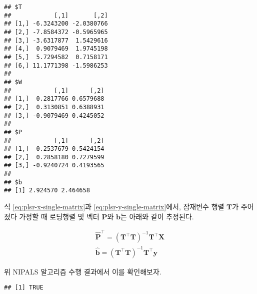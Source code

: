 \documentclass[
]{book}
\newenvironment{Shaded}{\begin{snugshade}}{\end{snugshade}}
\newcommand{\AttributeTok}[1]{\textcolor[rgb]{0.77,0.63,0.00}{#1}}
\newcommand{\DecValTok}[1]{\textcolor[rgb]{0.00,0.00,0.81}{#1}}
\newcommand{\FunctionTok}[1]{\textcolor[rgb]{0.00,0.00,0.00}{#1}}
\newcommand{\NormalTok}[1]{#1}
\newcommand{\OtherTok}[1]{\textcolor[rgb]{0.56,0.35,0.01}{#1}}
\newcommand{\SpecialCharTok}[1]{\textcolor[rgb]{0.00,0.00,0.00}{#1}}
\begin{document}
\begin{verbatim}
## $T
##            [,1]       [,2]
## [1,] -6.3243200 -2.0380766
## [2,] -7.8584372 -0.5965965
## [3,] -3.6317877  1.5429616
## [4,]  0.9079469  1.9745198
## [5,]  5.7294582  0.7158171
## [6,] 11.1771398 -1.5986253
## 
## $W
##            [,1]      [,2]
## [1,]  0.2817766 0.6579688
## [2,]  0.3130851 0.6388931
## [3,] -0.9079469 0.4245052
## 
## $P
##            [,1]      [,2]
## [1,]  0.2537679 0.5424154
## [2,]  0.2858180 0.7279599
## [3,] -0.9240724 0.4193565
## 
## $b
## [1] 2.924570 2.464658
\end{verbatim}

식 \eqref{eq:plsr-x-single-matrix}과 \eqref{eq:plsr-y-single-matrix}에서, 잠재변수 행렬 \(\mathbf{T}\)가 주어졌다 가정할 때 로딩행렬 및 벡터 \(\mathbf{P}\)와 \(\mathbf{b}\)는 아래와 같이 추정된다.

\begin{eqnarray}
\hat{\mathbf{P}}^\top = \left(\mathbf{T}^\top \mathbf{T}\right)^{-1} \mathbf{T}^\top \mathbf{X} \label{eq:plsr-x-single-loading-est}\\
\hat{\mathbf{b}} = \left(\mathbf{T}^\top \mathbf{T}\right)^{-1} \mathbf{T}^\top \mathbf{y} \label{eq:plsr-y-single-loading-est}
\end{eqnarray}

위 NIPALS 알고리즘 수행 결과에서 이를 확인해보자.

\begin{Shaded}
\end{Shaded}

\begin{verbatim}
## [1] TRUE
\end{verbatim}

\begin{Shaded}
\end{Shaded}
\end{document}
